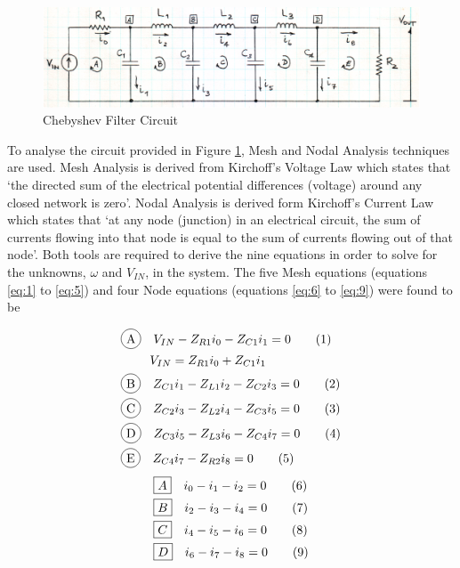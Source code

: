\documentclass[11pt,a4paper]{article}
\newcommand*\tageq{\refstepcounter{equation}\tag{\theequation}}
\newcommand*\circled[1]{\tikz[baseline=(char.base)]{
            \node[shape=circle,draw,inner sep=2pt] (char) {#1};}}
\begin{document}
\medskip	
\begin{figure}[h]
	\centering
	\includegraphics[width=0.9\linewidth]{Images/Circuit.png}
	\caption{Chebyshev Filter Circuit}
	\label{fig:circuit}
\end{figure}

To analyse the circuit provided in Figure \ref{fig:circuit}, Mesh and Nodal Analysis techniques are used. Mesh Analysis is derived from Kirchoff's Voltage Law which states that `the directed sum of the electrical potential differences (voltage) around any closed network is zero'. Nodal Analysis is derived form Kirchoff's Current Law which states that `at any node (junction) in an electrical circuit, the sum of currents flowing into that node is equal to the sum of currents flowing out of that node'. Both tools are required to derive the nine equations in order to solve for the unknowns, $\omega$ and $V_{IN}$, in the system. The five Mesh equations (equations \ref{eq:1} to \ref{eq:5}) and four Node equations (equations \ref{eq:6} to \ref{eq:9}) were found to be

\begin{align}
	&\circled{A} \quad V_{IN} - Z_{R1}i_{0} - Z_{C1}i_{1} = 0 \tageq\label{eq:1}\\
	&\quad \quad \, \, V_{IN} = Z_{R1}i_{0} + Z_{C1}i_{1} \notag \\
	&\circled{B} \quad Z_{C1}i_{1} - Z_{L1}i_{2} - Z_{C2}i_{3} = 0 \tageq\label{eq:2}\\
	&\circled{C} \quad Z_{C2}i_{3} - Z_{L2}i_{4} - Z_{C3}i_{5} = 0 \tageq\label{eq:3}\\
	&\circled{D} \quad Z_{C3}i_{5} - Z_{L3}i_{6} - Z_{C4}i_{7} = 0 \tageq\label{eq:4}\\
	&\circled{E} \quad Z_{C4}i_{7} - Z_{R2}i_{8} = 0 \tageq\label{eq:5}
\end{align}
\begin{align}
	&\boxed{A} \quad i_{0} - i_{1} - i_{2} = 0 \tageq\label{eq:6}\\
	&\boxed{B} \quad i_{2} - i_{3} - i_{4} = 0 \tageq\label{eq:7}\\
	&\boxed{C} \quad i_{4} - i_{5} - i_{6} = 0 \tageq\label{eq:8}\\
	&\boxed{D} \quad i_{6} - i_{7} - i_{8} = 0 \tageq\label{eq:9}
\end{align}\\
\end{document}
